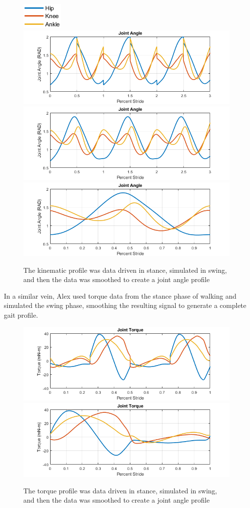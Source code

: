 \documentclass[runningheads,a4paper]{llncs}
\begin{document}
		\begin{figure}
			\centering
			\includegraphics[width=.1\textwidth]{akin4.PNG} \\
			\includegraphics[width=.7\textwidth]{akin1.png} \\
			\includegraphics[width=.7\textwidth]{akin2.png} \\
			\includegraphics[width=.7\textwidth]{akin3.png}
			\caption{The kinematic profile was data driven in stance, simulated in swing, and then the data was smoothed to create a joint angle profile}
			\label{fig:alexkinematics}
		\end{figure}
		In a similar vein, Alex used torque data from the stance phase of walking and simulated the swing phase, smoothing the resulting signal to generate a complete gait profile.
			\begin{figure}
				\centering
				\includegraphics[width=.7\textwidth]{atorque1.png}
				\includegraphics[width=.7\textwidth]{atorque2.png}
				\caption{The torque profile was data driven in stance, simulated in swing, and then the data was smoothed to create a joint angle profile}
				\label{fig:alextorques}
			\end{figure}
\end{document}
